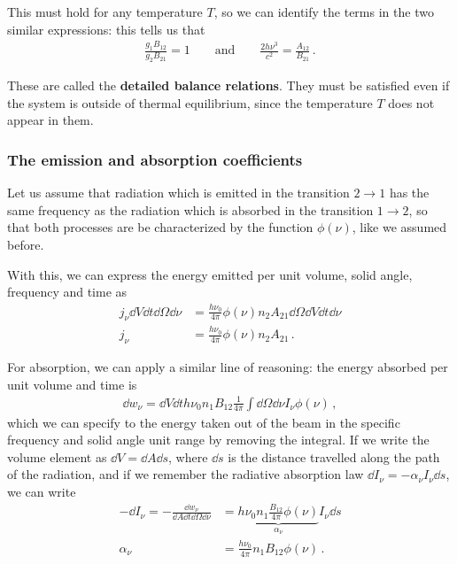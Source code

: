 \documentclass[main.tex]{subfiles}
\begin{document}
This must hold for any temperature \(T\), so we can identify the terms in the two similar expressions: this tells us that 
%
\begin{align}
\frac{g_1 B_{12} }{g_2 B_{21} } = 1 
\qquad \text{and} \qquad
\frac{2 h \nu^3}{c^2} = \frac{A_{12} }{B_{21} }
\,.
\end{align}

These are called the \textbf{detailed balance relations}. They must be satisfied even if the system is outside of thermal equilibrium, since the temperature \(T\) does not appear in them. 


\subsubsection{The emission and absorption coefficients}

Let us assume that radiation which is emitted in the transition \(2 \to 1\) has the same frequency as the radiation which is absorbed in the transition \(1 \to 2\), so that both processes are be characterized by the function \(\phi (\nu )\), like we assumed before. 

With this, we can express the energy emitted per unit volume, solid angle, frequency and time as 
%
\begin{align}
j_\nu \dd{V} \dd{t} \dd{\Omega } \dd{\nu } &= \frac{h \nu_0}{4 \pi } \phi (\nu ) n_2 A_{21} \dd{\Omega } \dd{V} \dd{t} \dd{\nu }  \\ 
j_\nu &= \frac{h \nu_0}{4 \pi } \phi (\nu ) n_2 A_{21}  
\,.
\end{align}

For absorption, we can apply a similar line of reasoning: 
the energy absorbed per unit volume and time is 
%
\begin{align}
\dd{w}_\nu = 
\dd{V} \dd{t} h \nu_0 n_1 B_{12} \frac{1}{4 \pi } \int \dd{\Omega } \dd{\nu } I_\nu \phi (\nu )
\,,
\end{align}
%
which we can specify to the energy taken out of the beam in the specific frequency and solid angle unit range by removing the integral. 
If we write the volume element as \(\dd{V} = \dd{A} \dd{s}\), where \(\dd{s}\) is the distance travelled along the path of the radiation, and if we remember the radiative absorption law \(\dd{I_\nu } = - \alpha _\nu I_\nu \dd{s}\), we can write 
%
\begin{align}
- \dd{I_\nu } = -\frac{ \dd{w}_\nu }{ \dd{A} \dd{t} \dd{\Omega } \dd{\nu }}
&= \underbrace{h \nu_0 n_1 \frac{B_{12}}{4 \pi } \phi(\nu )}_{\alpha _\nu } I_\nu  \dd{s} \\ 
\alpha_\nu &= \frac{h \nu_0  }{4 \pi } n_1 B_{12} \phi (\nu )
\,.
\end{align}
\end{document}
